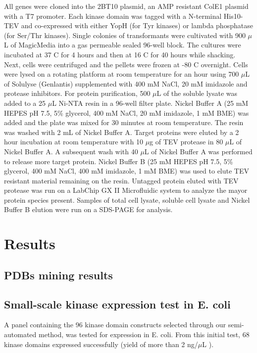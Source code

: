 \documentclass[aps,pre,twocolumn,nofootinbib,superscriptaddress,linenumbers]{revtex4-1}
\begin{document}
All genes were cloned into the 2BT10 plasmid, an AMP resistant ColE1 plasmid with a T7 promoter.
Each kinase domain was tagged with a N-terminal His10-TEV and co-expressed with either YopH (for Tyr kinases) or lambda phosphatase (for Ser/Thr kinases). 
Single colonies of transformants were cultivated with 900 $\mu$L of MagicMedia into a gas permeable sealed 96-well block. 
The cultures were incubated at 37 C for 4 hours and then at 16 C for 40 hours while shacking. 
Next, cells were centrifuged and the pellets were frozen at -80 C overnight. 
Cells were lysed on a rotating platform at room temperature for an hour using 700 $\mu$L of Solulyse (Genlantis) supplemented with 400 mM NaCl, 20 mM imidazole and protease inhibitors. 
For protein purification, 500 $\mu$L of the soluble lysate was added to a 25 $\mu$L Ni-NTA resin in a 96-well filter plate. 
Nickel Buffer A (25 mM HEPES pH 7.5, 5\% glycerol, 400 mM NaCl, 20 mM imidazole, 1 mM BME) was added and the plate was mixed for 30 minutes at room temperature. 
The resin was washed with 2 mL of Nickel Buffer A. 
Target proteins were eluted by a 2 hour incubation at room temperature with 10 $\mu$g of TEV protease in 80 $\mu$L of Nickel Buffer A.
A subsequent wash with 40 $\mu$L of Nickel Buffer A was performed to release more target protein. 
Nickel Buffer B (25 mM HEPES pH 7.5, 5\% glycerol, 400 mM NaCl, 400 mM imidazole, 1 mM BME) was used to elute TEV resistant material remaining on the resin.
Untagged protein eluted with TEV protease was run on a LabChip GX II Microfluidic system to analyze the mayor protein species present. 
Samples of total cell lysate, soluble cell lysate and Nickel Buffer B elution were run on a SDS-PAGE for analysis. 

\section{Results}
\label{section:results}

\subsection{PDBs mining results}

\subsection{Small-scale kinase expression test in E. coli}

A panel containing the 96 kinase domain constructs selected through our semi-automated method, was tested for expression in E. coli. 
From this initial test, 68 kinase domains expressed successfully (yield of more than 2 ng/$\mu$L ). 


 

\end{document}
